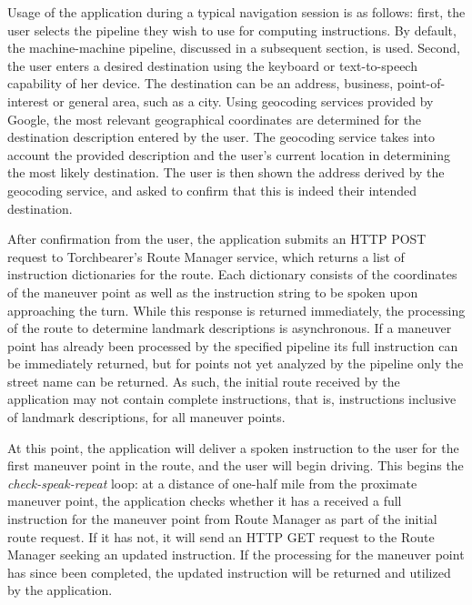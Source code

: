 Usage of the application during a typical navigation session is as follows: first, the user selects the pipeline they wish to use for computing instructions. By default, the machine-machine pipeline, discussed in a subsequent section, is used. Second, the user enters a desired destination using the keyboard or text-to-speech capability of her device. The destination can be an address, business, point-of-interest or general area, such as a city. Using geocoding services provided by Google, the most relevant geographical coordinates are determined for the destination description entered by the user. The geocoding service takes into account the provided description and the user’s current location in determining the most likely destination. The user is then shown the address derived by the geocoding service, and asked to confirm that this is indeed their intended destination.

After confirmation from the user, the application submits an HTTP POST request to Torchbearer’s Route Manager service, which returns a list of instruction dictionaries for the route. Each dictionary consists of the coordinates of the maneuver point as well as the instruction string to be spoken upon approaching the turn. While this response is returned immediately, the processing of the route to determine landmark descriptions is asynchronous. If a maneuver point has already been processed by the specified pipeline its full instruction can be immediately returned, but for points not yet analyzed by the pipeline only the street name can be returned. As such, the initial route received by the application may not contain complete instructions, that is, instructions inclusive of landmark descriptions, for all maneuver points. 

At this point, the application will deliver a spoken instruction to the user for the first maneuver point in the route, and the user will begin driving. This begins the \textit{check-speak-repeat} loop: at a distance of one-half mile from the proximate maneuver point, the application checks whether it has a received a full instruction for the maneuver point from Route Manager as part of the initial route request. If it has not, it will send an HTTP GET request to the Route Manager seeking an updated instruction. If the processing for the maneuver point has since been completed, the updated instruction will be returned and utilized by the application. 

